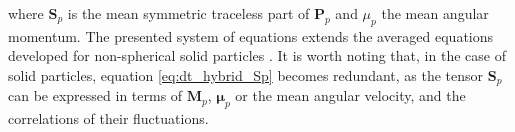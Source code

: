 where $\textbf{S}_p$ is the mean symmetric traceless part of $\textbf{P}_p $ and $\mu_p$ the mean angular momentum.%
The presented system of equations extends the averaged equations developed for non-spherical solid particles \citep{curtiss1956kinetic}. 
It is worth noting that, in the case of solid particles, equation \ref{eq:dt_hybrid_Sp} becomes redundant, as the tensor $\textbf{S}_p$ can be expressed in terms of $\textbf{M}_p$, $\bm{\mu}_p$ or the mean angular velocity, and the correlations of their fluctuations.
